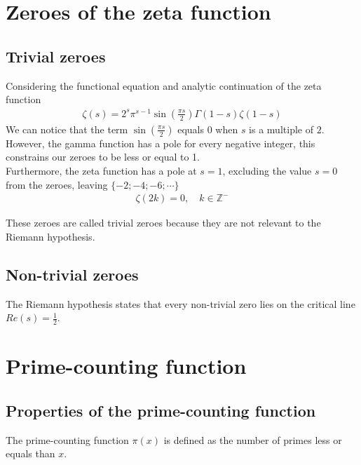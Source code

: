 \documentclass{article}
\begin{document}
\pagebreak

\section{Zeroes of the zeta function}

\subsection{Trivial zeroes}

Considering the functional equation and analytic continuation of the zeta function
\begin{align*}
    \zeta(s)=2^s\pi^{s-1}\sin\left(\frac{\pi s}{2}\right)\Gamma(1-s)\zeta(1-s)
\end{align*}
We can notice that the term \(\sin\left(\frac{\pi s}{2}\right)\) equals \(0\) when \(s\) is a multiple of \(2\).
\\
However, the gamma function has a pole for every negative integer, this constrains our zeroes to be less or equal to 1.\\
Furthermore, the zeta function has a pole at \(s=1\), excluding the value \(s=0\) from the zeroes, leaving \(\{-2;-4;-6;\cdots\}\)
\begin{align*}
    \zeta(2k)=0,
    \quad k\in \mathbb{Z}^{-}
\end{align*}

These zeroes are called trivial zeroes because they are not relevant to the Riemann hypothesis.

\subsection{Non-trivial zeroes}

The Riemann hypothesis states that every non-trivial zero lies on the critical line \(Re(s)=\frac{1}{2}\).

\pagebreak

\section{Prime-counting function}

\subsection{Properties of the prime-counting function}

The prime-counting function \(\pi(x)\) is defined as the number of primes less or equals than \(x\).
\end{document}
